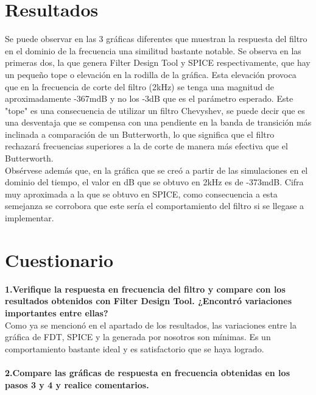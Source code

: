 \documentclass[12pt]{article}
\begin{document}
\section{Resultados}
Se puede observar en las 3 gráficas diferentes que muestran la respuesta del filtro en el dominio de la frecuencia una similitud bastante notable. Se observa en las primeras dos, la que genera Filter Design Tool y SPICE respectivamente, que hay un pequeño tope o elevación en la rodilla de la gráfica. Esta elevación provoca que en la frecuencia de corte del filtro (2kHz) se tenga una magnitud de aproximadamente -367mdB y no los -3dB que es el parámetro esperado. Este "tope" es una consecuencia de utilizar un filtro Chevyshev, se puede decir que es una desventaja que se compensa con una pendiente en la banda de transición más inclinada a comparación de un Butterworth, lo que significa que el filtro rechazará frecuencias superiores a la de corte de manera más efectiva que el Butterworth. 
\\
Obsérvese además que, en la gráfica que se creó a partir de las simulaciones en el dominio del tiempo, el valor en dB que se obtuvo en 2kHz es de -373mdB. Cifra muy aproximada a la que se obtuvo en SPICE, como consecuencia a esta semejanza se corrobora que este sería el comportamiento del filtro si se llegase a implementar. 
\newpage
\section{Cuestionario}
\textbf{1.Verifique la respuesta en frecuencia del filtro y compare con los resultados obtenidos con Filter Design Tool. ¿Encontró variaciones importantes entre ellas?}
\\
Como ya se mencionó en el apartado de los resultados, las variaciones entre la gráfica de FDT, SPICE y la generada por nosotros son mínimas. Es un comportamiento bastante ideal y es satisfactorio que se haya logrado.
\\
\\
\textbf{2.Compare las gráficas de respuesta en frecuencia obtenidas en los pasos 3 y 4 y realice comentarios.}
\end{document}
